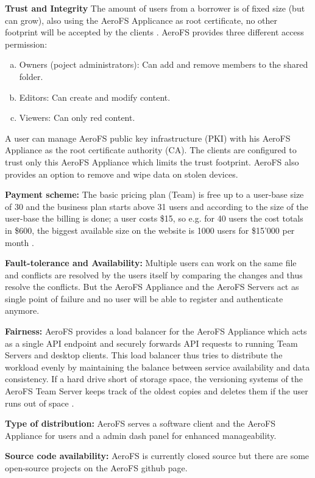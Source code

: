 \textbf{Trust and Integrity} The amount of users from a borrower is of fixed size (but can grow), also using the AeroFS Applicance as root certificate, no other footprint will be accepted by the clients \cite{aerofs:security}. AeroFS provides three different access permission:
\begin{enumerate}[(a)]
\item Owners (poject administrators): Can add and remove members to the shared folder.
\item Editors: Can create and modify content.
\item Viewers: Can only red content.
\end{enumerate}
A user can manage AeroFS  public key infrastructure (PKI) with his AeroFS Appliance as the root certificate authority (CA). The clients are configured to trust only this AeroFS Appliance which limits the trust footprint. AeroFS also provides an option to remove and wipe data on stolen devices.

\textbf{Payment scheme:} The basic pricing plan (Team) is free up to a user-base size of 30 \cite{aerofs:blog:30_users_free} and the business plan starts above 31 users and according to the size of the user-base the billing is done; a user costs \$15, so e.g. for 40 users the cost totals in \$600, the biggest available size on the website is 1000 users for \$15'000 per month \cite{aerofs:pricing}.

\textbf{Fault-tolerance and Availability:} Multiple users can work on the same file and conflicts are resolved by the users itself by comparing the changes and thus resolve the conflicts. But the AeroFS Appliance and the AeroFS Servers act as single point of failure and no user will be able to register and authenticate anymore.

\textbf{Fairness:} AeroFS provides a load balancer for the AeroFS Appliance which acts as a single API endpoint and securely forwards API requests to running Team Servers and desktop clients. This load balancer thus tries to distribute the workload evenly by maintaining the balance between service availability and data consistency.
If a hard drive short of storage space, the versioning systems of the AeroFS Team Server keeps track of the oldest copies and deletes them if the user runs out of space \cite{aerofs:USTO.RE}.

\textbf{Type of distribution:} AeroFS serves a software client and the AeroFS Appliance for users and a admin dash panel for enhanced manageability.

\textbf{Source code availability:} AeroFS is currently closed source but there are some open-source projects on the AeroFS github page.

